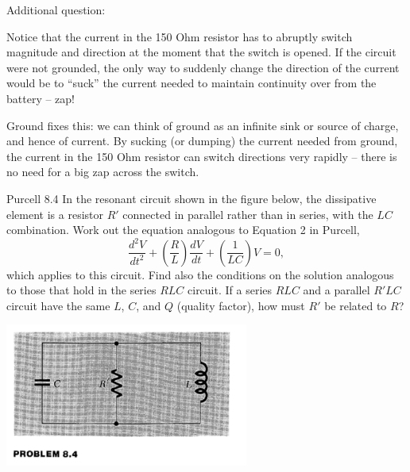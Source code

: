 \documentclass[makesolutionspdf]{esg8022pset}
\begin{document}
\begin{solution}
  Additional question: 

  Notice that the current in the 150 Ohm resistor has to abruptly switch
  magnitude and direction at the moment that the switch is opened. If
  the circuit were not grounded, the only way to suddenly change the
  direction of the current would be to ``suck'' the current needed to
  maintain continuity over from the battery -- zap!

  Ground fixes this: we can think of ground as an infinite sink or
  source of charge, and hence of current. By sucking (or dumping) the
  current needed from ground, the current in the 150 Ohm resistor can
  switch directions very rapidly -- there is no need for a big zap
  across the switch.
\end{solution}



\begin{problem}{Purcell 8.4}
  In the resonant circuit shown in the figure below, the dissipative
  element is a resistor $R'$ connected in parallel rather than in series,
  with the $LC$ combination.  Work out the equation analogous to Equation 2
  in Purcell,
  \begin{equation*}
    \frac{d^2V}{dt^2} + \left(\frac{R}{L}\right)\frac{dV}{dt} + \left(\frac{1}{LC}\right)V = 0,
  \end{equation*}
  which applies to this circuit.  Find also the conditions on the solution
  analogous to those that hold in the series $RLC$ circuit.  If a series
  $RLC$ and a parallel $R'LC$ circuit have the same $L$, $C$, and $Q$
  (quality factor), how must $R'$ be related to $R$?
  
  \begin{center}
    \includegraphics[width = 0.6\textwidth]{figpu804}
  \end{center}
\end{problem}
\end{document}
